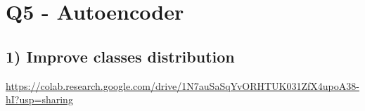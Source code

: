 \documentclass[a4paper]{article}    %
\begin{document}
\section{Q5 - Autoencoder}

\subsection{1) Improve classes distribution}

\href{https://colab.research.google.com/drive/1N7auSaSqYvORHTUK031ZfX4upoA38-hI?usp=sharing}{https://colab.research.google.com/drive/1N7auSaSqYvORHTUK031ZfX4upoA38-hI?usp=sharing}

\end{document}
